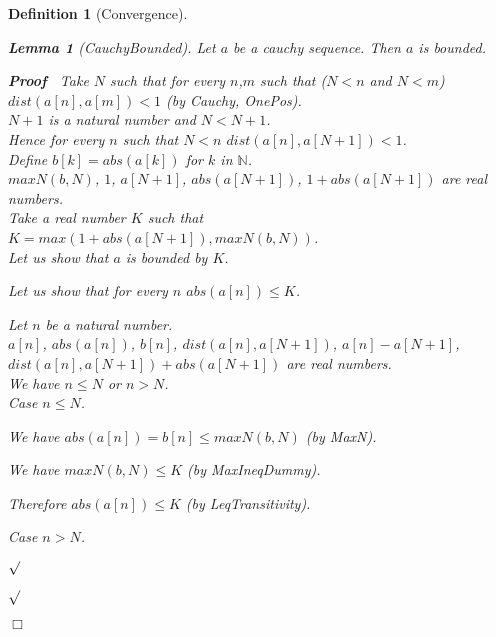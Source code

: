 \documentclass{article}
\newenvironment{forthel}{\begin{leftbar}}{\end{leftbar}}
\newenvironment{proof}{\noindent\textbf{Proof\ }}{\hspace*{\fill}$\Box$\medskip}
\newenvironment{subproof}{\begin{list}{}{}
		\item[\text{Proof}]}{\hfill $\surd$ \end{list}}
\newenvironment{case}{\begin{list}{}{}
		\item[]}{\end{list}}
\newtheorem{lemma}{Lemma}
\newtheorem{definition}{Definition}
\newcommand{\NN}{\mathbb{N}}
\begin{document}
\begin{forthel}
\begin{definition}[Convergence]
	\begin{lemma}[CauchyBounded]
		Let $a$ be a cauchy sequence. Then $a$ is bounded.
	\end{lemma}
	\begin{proof}
		Take $N$ such that for every $n$,$m$ such that ($N < n$ and $N < m$) $dist(a[n],a[m]) < 1$ (by Cauchy, OnePos). \\
		$N + 1$ is a natural number and $N < N + 1$.\\
		Hence for every $n$ such that $N < n$ $dist(a[n],a[N + 1]) < 1$.\\
		Define $b[k] = abs(a[k])$ for $k$ in $\NN$.\\
		$maxN(b,N)$, $1$, $a[N + 1]$, $abs(a[N + 1])$, $1 + abs(a[N + 1])$ are real numbers.\\
		Take a real number $K$ such that $K = max(1 + abs(a[N + 1]), maxN(b,N))$.\\
		
		\noindent Let us show that $a$ is bounded by $K$.		
		\begin{subproof}
			Let us show that for every $n$ $abs(a[n]) \leq K$. 
			\begin{subproof}
				Let $n$ be a natural number.\\				
				$a[n]$, $abs(a[n])$, $b[n]$, $dist(a[n],a[N + 1])$, $a[n] - a[N + 1]$, $dist(a[n],a[N + 1]) + abs(a[N + 1])$ are real numbers.\\
				We have $n \leq N$ or $n > N$.\\
				Case $n \leq N$.
				\begin{case}
					We have $abs(a[n]) = b[n] \leq maxN(b,N)$ (by MaxN).
					
					We have $maxN(b,N) \leq K$ (by MaxIneqDummy).
					
					Therefore $abs(a[n]) \leq K$ (by LeqTransitivity).
					
				\end{case}	
				
				Case $n > N$.
				

\end{subproof}
\end{subproof}
\end{proof}
\end{definition}
\end{forthel}
\end{document}

